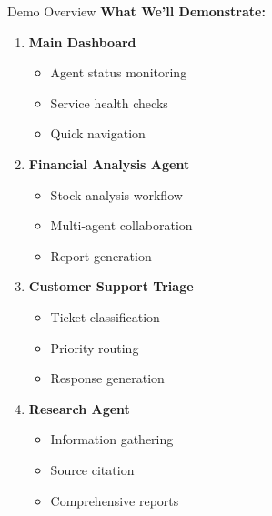 \documentclass[aspectratio=169,11pt]{beamer}
\begin{document}
\begin{frame}{Demo Overview}
\textbf{What We'll Demonstrate:}

\begin{enumerate}
    \item \textbf{Main Dashboard}
    \begin{itemize}
        \item Agent status monitoring
        \item Service health checks
        \item Quick navigation
    \end{itemize}
    
    \item \textbf{Financial Analysis Agent}
    \begin{itemize}
        \item Stock analysis workflow
        \item Multi-agent collaboration
        \item Report generation
    \end{itemize}
    
    \item \textbf{Customer Support Triage}
    \begin{itemize}
        \item Ticket classification
        \item Priority routing
        \item Response generation
    \end{itemize}
    
    \item \textbf{Research Agent}
    \begin{itemize}
        \item Information gathering
        \item Source citation
        \item Comprehensive reports
    \end{itemize}
\end{enumerate}
\end{frame}
\end{document}
